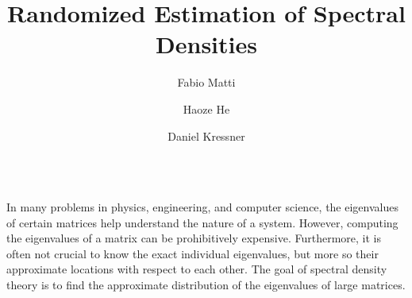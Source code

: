 \documentclass[final, leqno, 12pt]{beamer}
\title{Randomized Estimation of Spectral Densities}
\author{Fabio Matti \and Haoze He \and Daniel Kressner}
\institute[shortinst]{ANCHP, École polytechnique fédérale de Lausanne (EPFL), Lausanne, Switzerland}
\begin{document}

\begin{frame}[t]
\vspace{-20pt}
\begin{columns}[t]
\begin{column}{0.85\paperwidth}
\vspace{-45pt}
    \justify
    In many problems in physics, engineering, and computer science, 
    the eigenvalues of certain matrices help understand the nature of a system.
    However, computing the eigenvalues of a matrix can be prohibitively expensive.
    Furthermore, it is often not crucial to know the exact individual eigenvalues,
    but more so their approximate locations with respect to each other.
    The goal of spectral density theory is to find the approximate distribution of
    the eigenvalues of large matrices.
\vspace{15pt}
\end{column}
\end{columns}


\begin{columns}[t]

    \begin{column}{0.45\paperwidth}


\end{column}
\end{columns}
\end{frame}
\end{document}
